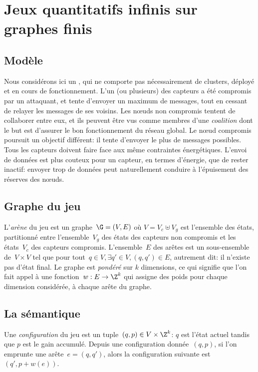 \section{Jeux quantitatifs infinis sur graphes finis}
\label{tj:sec:model}

\subsection{Modèle}
Nous considérons ici un \rcsf, qui ne comporte pas nécessairement de clusters, déployé et en cours de fonctionnement.
L'un (ou plusieurs) des capteurs a été compromis par un attaquant, et tente d'envoyer un maximum de messages, tout en cessant de relayer les messages de ses voisins.
Les nœuds non compromis tentent de collaborer entre eux, et ils peuvent être vus comme membres d'une \emph{coalition} dont le but est d'assurer le bon fonctionnement du réseau global.
Le nœud compromis poursuit un objectif différent: il tente d'envoyer le plus de messages possibles.
Tous les capteurs doivent faire face aux même contraintes énergétiques.
L'envoi de données est plus couteux pour un capteur, en termes d'énergie, que de rester inactif: envoyer trop de données peut naturellement conduire à l'épuisement des réserves des nœuds.

\subsection{Graphe du jeu}
L'\emph{arène} du jeu est un graphe~$\G = (V,E)$ où $V = V_c \uplus V_g$ est l'ensemble des états, partitionné entre l'ensemble~$V_g$ des états des capteurs non compromis et les états~$V_c$ des capteurs compromis.
L'ensemble~$E$ des arêtes est un sous-ensemble de~$V \times V$ tel que pour tout~$q \in V, \exists q' \in V, (q,q')\in E$, autrement dit: il n'existe pas d'état final.
Le graphe est \emph{pondéré} sur $k$ dimensions, ce qui signifie que l'on fait appel à une fonction~$w: E \rightarrow \Z^k$ qui assigne des poids pour chaque dimension considérée, à chaque arête du graphe.

\subsection{La sémantique}
Une \emph{configuration} du jeu est un tuple~$(q,p) \in V \times \Z^k$: $q$ est l'état actuel tandis que $p$ est le gain accumulé.
Depuis une configuration donnée~$(q,p)$, si l'on emprunte une arête~$e=(q,q')$, alors la configuration suivante est $(q',p+w(e))$.

